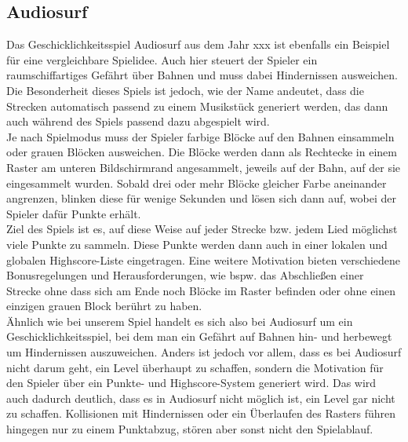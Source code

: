 \subsection{Audiosurf}

Das Geschicklichkeitsspiel Audiosurf aus dem Jahr xxx ist ebenfalls ein Beispiel für eine vergleichbare Spielidee. Auch hier steuert der Spieler ein raumschiffartiges Gefährt über Bahnen und muss dabei Hindernissen ausweichen. Die Besonderheit dieses Spiels ist jedoch, wie der Name andeutet, dass die Strecken automatisch passend zu einem Musikstück generiert werden, das dann auch während des Spiels passend dazu abgespielt wird.\\
Je nach Spielmodus muss der Spieler farbige Blöcke auf den Bahnen einsammeln oder grauen Blöcken ausweichen. Die Blöcke werden dann als Rechtecke in einem Raster am unteren Bildschirmrand angesammelt, jeweils auf der Bahn, auf der sie eingesammelt wurden. Sobald drei oder mehr Blöcke gleicher Farbe aneinander angrenzen, blinken diese für wenige Sekunden und lösen sich dann auf, wobei der Spieler dafür Punkte erhält.\\
Ziel des Spiels ist es, auf diese Weise auf jeder Strecke bzw. jedem Lied möglichst viele Punkte zu sammeln. Diese Punkte werden dann auch in einer lokalen und globalen Highscore-Liste eingetragen. Eine weitere Motivation bieten verschiedene Bonusregelungen und Herausforderungen, wie bspw. das Abschließen einer Strecke ohne dass sich am Ende noch Blöcke im Raster befinden oder ohne einen einzigen grauen Block berührt zu haben.\\
Ähnlich wie bei unserem Spiel handelt es sich also bei Audiosurf um ein Geschicklichkeitsspiel, bei dem man ein Gefährt auf Bahnen hin- und herbewegt um Hindernissen auszuweichen. Anders ist jedoch vor allem, dass es bei Audiosurf nicht darum geht, ein Level überhaupt zu schaffen, sondern die Motivation für den Spieler über ein Punkte- und Highscore-System generiert wird. Das wird auch dadurch deutlich, dass es in Audiosurf nicht möglich ist, ein Level gar nicht zu schaffen. Kollisionen mit Hindernissen oder ein Überlaufen des Rasters führen hingegen nur zu einem Punktabzug, stören aber sonst nicht den Spielablauf.